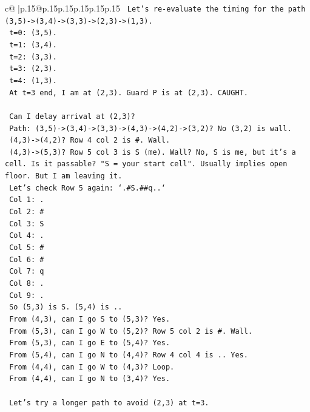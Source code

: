\documentclass{article}
\begin{document}
{\begin{supertabular}{c@{$\;$}|p{.15\linewidth}@{}p{.15\linewidth}p{.15\linewidth}p{.15\linewidth}p{.15\linewidth}p{.15\linewidth}}
{{{\texttt{   Let's re{-}evaluate the timing for the path (3,5){-}>(3,4){-}>(3,3){-}>(2,3){-}>(1,3).} \\
\texttt{   t=0: (3,5).} \\
\texttt{   t=1: (3,4).} \\
\texttt{   t=2: (3,3).} \\
\texttt{   t=3: (2,3).} \\
\texttt{   t=4: (1,3).} \\
\texttt{   At t=3 end, I am at (2,3). Guard P is at (2,3). CAUGHT.} \\
\\ 
\texttt{   Can I delay arrival at (2,3)?} \\
\texttt{   Path: (3,5){-}>(3,4){-}>(3,3){-}>(4,3){-}>(4,2){-}>(3,2)? No (3,2) is wall.} \\
\texttt{   (4,3){-}>(4,2)? Row 4 col 2 is \#. Wall.} \\
\texttt{   (4,3){-}>(5,3)? Row 5 col 3 is S (me). Wall? No, S is me, but it's a cell. Is it passable? "S = your start cell". Usually implies open floor. But I am leaving it.} \\
\texttt{   Let's check Row 5 again: `.\#S.\#\#q..`} \\
\texttt{   Col 1: .} \\
\texttt{   Col 2: \#} \\
\texttt{   Col 3: S} \\
\texttt{   Col 4: .} \\
\texttt{   Col 5: \#} \\
\texttt{   Col 6: \#} \\
\texttt{   Col 7: q} \\
\texttt{   Col 8: .} \\
\texttt{   Col 9: .} \\
\texttt{   So (5,3) is S. (5,4) is ..} \\
\texttt{   From (4,3), can I go S to (5,3)? Yes.} \\
\texttt{   From (5,3), can I go W to (5,2)? Row 5 col 2 is \#. Wall.} \\
\texttt{   From (5,3), can I go E to (5,4)? Yes.} \\
\texttt{   From (5,4), can I go N to (4,4)? Row 4 col 4 is .. Yes.} \\
\texttt{   From (4,4), can I go W to (4,3)? Loop.} \\
\texttt{   From (4,4), can I go N to (3,4)? Yes.} \\
\\ 
\texttt{   Let's try a longer path to avoid (2,3) at t=3.} \\
}}}
\end{supertabular}}
\end{document}
